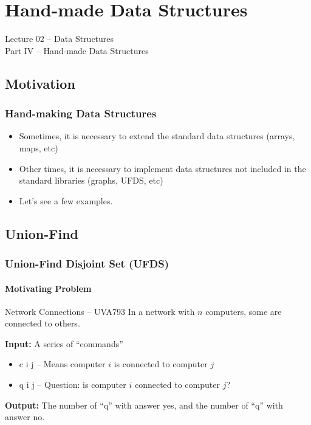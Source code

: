 \section{Hand-made Data Structures}
\begin{frame}
  \begin{center}
    {\large Lecture 02 -- Data Structures\\Part IV -- Hand-made Data Structures}\\
  \end{center}
\end{frame}

\subsection{Motivation}
\begin{frame}
  \frametitle{Hand-making Data Structures}

  \begin{itemize}
  \item Sometimes, it is necessary to extend the standard data structures
    (arrays, maps, etc)
    \bigskip

  \item Other times, it is necessary to implement data structures not
    included in the standard libraries (graphs, UFDS, etc)
    \bigskip

  \item Let's see a few examples.
  \end{itemize}
\end{frame}

\subsection{Union-Find}
\begin{frame}
  \frametitle{Union-Find Disjoint Set (UFDS)}
  \framesubtitle{Motivating Problem}

  \begin{block}{Network Connections -- UVA793}
    In a network with $n$ computers, some are connected to others.\\
    \bigskip

    {\bf Input:} A series of ``commands''
    \begin{itemize}
    \item c i j -- Means computer $i$ is connected to computer $j$
    \item q i j -- Question: is computer $i$ connected to computer $j$?
    \end{itemize}

    \bigskip

    {\bf Output:} The number of ``q'' with answer yes, and the number
    of ``q'' with answer no.

  \end{block}
\end{frame}

